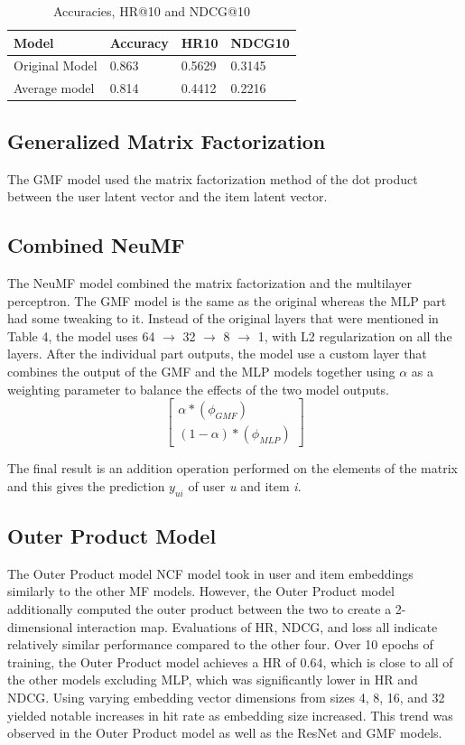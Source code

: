 \documentclass{article}
\begin{document}
\begin{table}[h]
\caption{Accuracies, HR@10 and NDCG@10}
\centering
\begin{tabular}{llll}
\toprule
Model & Accuracy & HR10 & NDCG10 \\
\midrule
Original Model & 0.863 & 0.5629 & 0.3145 \\
Average model & 0.814 & 0.4412 & 0.2216 \\
\bottomrule
\end{tabular}
\label{tab:table6}
\end{table}

\subsection{Generalized Matrix Factorization}
The GMF model used the matrix factorization method of the dot product between the user latent vector and the item latent vector.

\subsection{Combined NeuMF}
The NeuMF model combined the matrix factorization and the multilayer perceptron. The GMF model is the same as the original whereas the MLP part had some tweaking to it. Instead of the original layers that were mentioned in Table 4, the model uses 64 $\rightarrow$ 32 $\rightarrow$ 8 $\rightarrow$ 1, with L2 regularization on all the layers. After the individual part outputs, the model use a custom layer that combines the output of the GMF and the MLP models together using $\alpha$ as a weighting parameter to balance the effects of the two model outputs.\\

\[
\begin{bmatrix}
\alpha * (\phi_{GMF}) \\
(1 - \alpha) * (\phi_{MLP})
\end{bmatrix}
\]

The final result is an addition operation performed on the elements of the matrix and this gives the prediction $y_{ui}$ of user \emph{u} and item \emph{i}.

\subsection{Outer Product Model}
The Outer Product model NCF model took in user and item embeddings similarly to the other MF models. However, the Outer Product model additionally computed the outer product between the two to create a 2-dimensional interaction map. Evaluations of HR, NDCG, and loss all indicate relatively similar performance compared to the other four. Over 10 epochs of training, the Outer Product model achieves a HR of $0.64$, which is close to all of the other models excluding MLP, which was significantly lower in HR and NDCG. Using varying embedding vector dimensions from sizes 4, 8, 16, and 32 yielded notable increases in hit rate as embedding size increased. This trend was observed in the Outer Product model as well as the ResNet and GMF models. 
\end{document}
